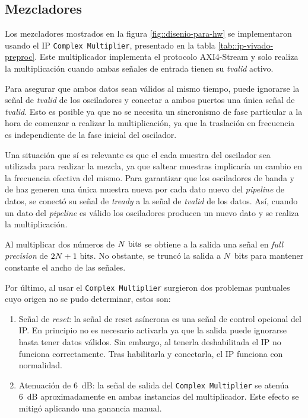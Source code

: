 \documentclass[../../main.tex]{subfiles}
\begin{document}
\subsection{Mezcladores}
Los mezcladores mostrados en la figura \ref{fig::disenio-para-hw} se implementaron usando el IP \texttt{Complex Multiplier}, presentado en la tabla \ref{tab::ip-vivado-preproc}. Este multiplicador implementa el protocolo AXI4-Stream y solo realiza la multiplicación cuando ambas señales de entrada tienen su \textit{tvalid} activo.

Para asegurar que ambos datos sean válidos al mismo tiempo, puede ignorarse la señal de \textit{tvalid} de los osciladores y conectar a ambos puertos una única señal de \textit{tvalid}. Esto es posible ya que no se necesita un sincronismo de fase particular a la hora de comenzar a realizar la multiplicación, ya que la traslación en frecuencia es independiente de la fase inicial del oscilador. 

Una situación que sí es relevante es que el cada muestra del oscilador sea utilizada para realizar la mezcla, ya que saltear muestras implicaría un cambio en la frecuencia efectiva del mismo. 
Para garantizar que los osciladores de banda y de haz generen una única muestra nueva por cada dato nuevo del \textit{pipeline} de datos, se conectó su señal de \textit{tready} a la señal de \textit{tvalid} de los datos. Así, cuando un dato del \textit{pipeline} es válido los osciladores producen un nuevo dato y se realiza la multiplicación.

Al multiplicar dos números de $N~\textrm{bits}$ se obtiene a la salida una señal en \textit{full precision} de $2 N + 1~\textrm{bits}$. No obstante, se truncó la salida a $N$~bits para mantener constante el ancho de las señales.

Por último, al usar el \texttt{Complex Multiplier} surgieron dos problemas puntuales cuyo origen no se pudo determinar, estos son:
\begin{enumerate}
    \item Señal de \textit{reset}: la señal de reset asíncrona es una señal de control opcional del IP. En principio no es necesario activarla ya que la salida puede ignorarse hasta tener datos válidos. Sin embargo, al tenerla deshabilitada el IP no funciona correctamente. Tras habilitarla y conectarla, el IP funciona con normalidad.
    \item Atenuación de 6~dB: la señal de salida del \texttt{Complex Multiplier} se atenúa 6~dB aproximadamente en ambas instancias del multiplicador. Este efecto se mitigó aplicando una ganancia manual.
\end{enumerate}
\end{document}
